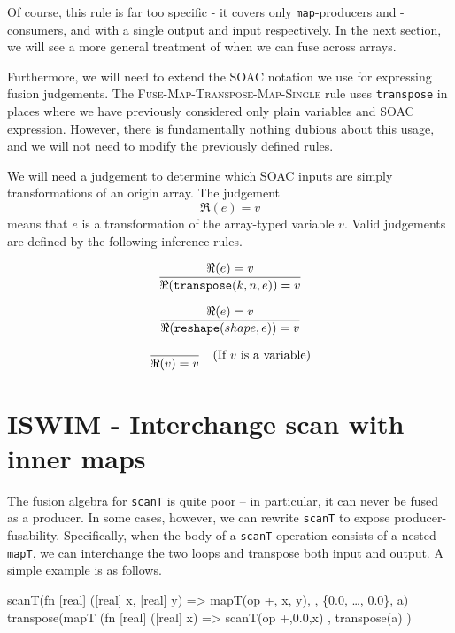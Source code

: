 Of course, this rule is far too specific - it covers only
\texttt{map}-producers and -consumers, and with a single output and
input respectively.  In the next section, we will see a more general
treatment of when we can fuse across arrays.

Furthermore, we will need to extend the SOAC notation we use for
expressing fusion judgements.  The
\textsc{Fuse-Map-Transpose-Map-Single} rule uses \texttt{transpose} in
places where we have previously considered only plain variables and
SOAC expression.  However, there is fundamentally nothing dubious
about this usage, and we will not need to modify the previously
defined rules.

We will need a judgement to determine which SOAC inputs are simply
transformations of an origin array.  The judgement
\[
\boxed{
  \Re(e) = v
}
\]
means that $e$ is a transformation of the array-typed variable $v$.
Valid judgements are defined by the following inference rules.

\begin{align*}
\frac{\displaystyle{
  \Re(e) = v
}}{\displaystyle{
  \Re(\texttt{transpose}(k,n,e)) = v
}}
\end{align*}

\begin{align*}
\frac{\displaystyle{
  \Re(e) = v
}}{\displaystyle{
  \Re(\texttt{reshape}(shape,e)) = v
}}
\end{align*}

\begin{align*}
  \frac{\displaystyle{
  }}{\displaystyle{
    \Re(v) = v
}} \quad (\mbox{If $v$ is a variable})
\end{align*}

\section{ISWIM - Interchange scan with inner maps}

The fusion algebra for \texttt{scanT} is quite poor -- in particular,
it can never be fused as a producer.  In some cases, however, we can
rewrite \texttt{scanT} to expose producer-fusability.  Specifically,
when the body of a \texttt{scanT} operation consists of a nested
\texttt{mapT}, we can interchange the two loops and transpose both
input and output.  A simple example is as follows.

\begin{colorcode}
scanT(fn [real] ([real] x, [real] y) =>
        mapT(op +, x, y),
     , \{0.0, \ldots, 0.0\}, a)   \emphh{\mymath{\equiv}}
transpose(mapT (fn [real] ([real] x) =>
                  scanT(op +,0.0,x)
               , transpose(a) )
\end{colorcode}

